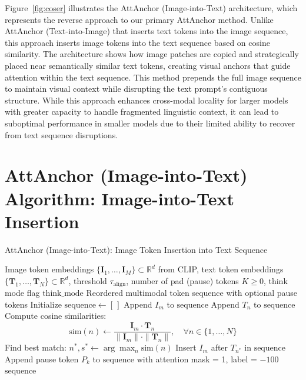 \documentclass[11pt]{article}
\begin{document}
Figure~\ref{fig:coser} illustrates the AttAnchor (Image-into-Text) architecture, which represents the reverse approach to our primary AttAnchor method. Unlike AttAnchor (Text-into-Image) that inserts text tokens into the image sequence, this approach inserts image tokens into the text sequence based on cosine similarity. The architecture shows how image patches are copied and strategically placed near semantically similar text tokens, creating visual anchors that guide attention within the text sequence. This method prepends the full image sequence to maintain visual context while disrupting the text prompt's contiguous structure. While this approach enhances cross-modal locality for larger models with greater capacity to handle fragmented linguistic context, it can lead to suboptimal performance in smaller models due to their limited ability to recover from text sequence disruptions.


\section{AttAnchor (Image-into-Text) Algorithm: Image-into-Text Insertion}
\label{app:alt_algorithm}

\begin{algorithm}[H]
\caption{AttAnchor (Image-into-Text): Image Token Insertion into Text Sequence}
\label{alg:image_into_text}
\begin{algorithmic}[1]
\Require Image token embeddings $\{\mathbf{I}_1, \dots, \mathbf{I}_M\} \subset \mathbb{R}^d$ from CLIP, text token embeddings $\{\mathbf{T}_1, \dots, \mathbf{T}_N\} \subset \mathbb{R}^d$, threshold $\tau_{\text{align}}$, number of pad (pause) tokens $K \geq 0$, think mode flag $\text{think\_mode}$
\Ensure Reordered multimodal token sequence with optional pause tokens
\State Initialize $\text{sequence} \gets [\,]$
    \State Append $I_m$ to $\text{sequence}$
\EndFor
{}
    \State Append $T_n$ to $\text{sequence}$
\EndFor
{}
    \State Compute cosine similarities: 
    \[
        \text{sim}(n) \gets \frac{\mathbf{I}_m \cdot \mathbf{T}_n}{\|\mathbf{I}_m\| \cdot \|\mathbf{T}_n\|}, \quad \forall n \in \{1, \dots, N\}
    \]
    \State Find best match: $n^*, s^* \gets \arg\max_{n} \text{sim}(n)$
        \State Insert $I_m$ after $T_{n^*}$ in $\text{sequence}$
    \EndIf
\EndFor
{}
        \State Append pause token $P_k$ to $\text{sequence}$ with attention mask = 1, label = $-100$
    \EndFor
\EndIf
\State \Return $\text{sequence}$
\end{algorithmic}
\end{algorithm}
\end{document}
